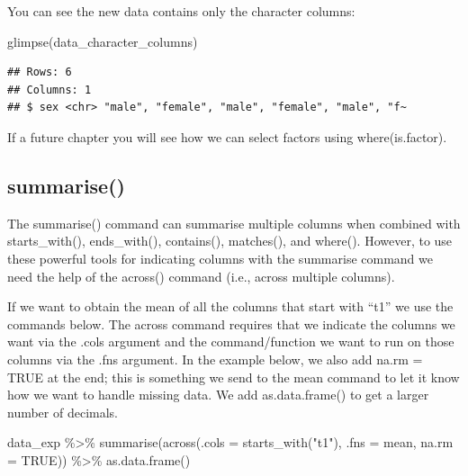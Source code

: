 \documentclass[
]{krantz}
\makeatletter
\newenvironment{Shaded}{\begin{snugshade}}{\end{snugshade}}
\newcommand{\AttributeTok}[1]{\textcolor[rgb]{0.61,0.61,0.61}{#1}}
\newcommand{\ConstantTok}[1]{\textcolor[rgb]{0,0,0}{#1}}
\newcommand{\FunctionTok}[1]{\textcolor[rgb]{0,0,0}{#1}}
\newcommand{\NormalTok}[1]{#1}
\newcommand{\SpecialCharTok}[1]{\textcolor[rgb]{0,0,0}{#1}}
\newcommand{\StringTok}[1]{\textcolor[rgb]{0.5,0.5,0.5}{#1}}
\newenvironment{kframe}{%
\medskip{}
\setlength{\fboxsep}{.8em}
 \def\at@end@of@kframe{}%
 \ifinner\ifhmode%
  \def\at@end@of@kframe{\end{minipage}}%
  \begin{minipage}{\columnwidth}%
 \fi\fi%
 \def\FrameCommand##1{\hskip\@totalleftmargin \hskip-\fboxsep
 \colorbox{shadecolor}{##1}\hskip-\fboxsep
     \hskip-\linewidth \hskip-\@totalleftmargin \hskip\columnwidth}%
 \MakeFramed {\advance\hsize-\width
   \@totalleftmargin\z@ \linewidth\hsize
   \@setminipage}}%
 {\par\unskip\endMakeFramed%
 \at@end@of@kframe}
\renewenvironment{Shaded}{\begin{kframe}}{\end{kframe}}
\makeatother
\begin{document}
You can see the new data contains only the character columns:

\begin{Shaded}
\begin{Highlighting}[]
\FunctionTok{glimpse}\NormalTok{(data\_character\_columns)}
\end{Highlighting}
\end{Shaded}

\begin{verbatim}
## Rows: 6
## Columns: 1
## $ sex <chr> "male", "female", "male", "female", "male", "f~
\end{verbatim}

If a future chapter you will see how we can select factors using where(is.factor).

\hypertarget{summarise-1}{%
\subsection{summarise()}\label{summarise-1}}

The summarise() command can summarise multiple columns when combined with starts\_with(), ends\_with(), contains(), matches(), and where(). However, to use these powerful tools for indicating columns with the summarise command we need the help of the across() command (i.e., across multiple columns).

If we want to obtain the mean of all the columns that start with ``t1'' we use the commands below. The across command requires that we indicate the columns we want via the .cols argument and the command/function we want to run on those columns via the .fns argument. In the example below, we also add na.rm = TRUE at the end; this is something we send to the mean command to let it know how we want to handle missing data. We add as.data.frame() to get a larger number of decimals.

\begin{Shaded}
\begin{Highlighting}[]
\NormalTok{data\_exp }\SpecialCharTok{\%\textgreater{}\%}
  \FunctionTok{summarise}\NormalTok{(}\FunctionTok{across}\NormalTok{(}\AttributeTok{.cols =} \FunctionTok{starts\_with}\NormalTok{(}\StringTok{"t1"}\NormalTok{), }
                   \AttributeTok{.fns =}\NormalTok{ mean,}
                   \AttributeTok{na.rm =} \ConstantTok{TRUE}\NormalTok{)) }\SpecialCharTok{\%\textgreater{}\%}
  \FunctionTok{as.data.frame}\NormalTok{()}
\end{Highlighting}
\end{Shaded}
\end{document}
